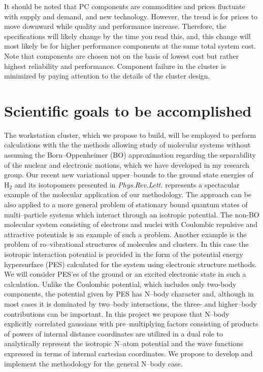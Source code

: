 It should be noted that PC components are commodities and prices
fluctuate
with supply and demand, and new technology. However, the trend is for
prices
to move downward while quality and performance increase. Therefore, the
specifications will likely change by the time you read this, and, this
change
will most likely be for higher performance components at the same total
system cost.
Note that components are chosen not on the basis of lowest cost but
rather
highest reliability and performance. Component failure in the cluster is
minimized by paying attention to the details of the cluster design.


\section{Scientific goals to be accomplished}



The workstation cluster, which we propose to build, will
be employed to perform calculations with the
the methods allowing study of molecular systems without
assuming the Born--Oppenheimer (BO) approximation regarding the
separability of the nuclear and electronic motions, which we have
developed in my research group.\cite{1,2,3,4,5,6}
Our recent new variational upper--bounds to the ground
state energies of H$_2$ and its isotopomers presented in
{\it Phys.Rev.Lett.}\cite{6} represents a spectacular example 
of the molecular application of our methodology.
The approach can be also applied to
a more general problem of stationary bound
quantum states of multi--particle
systems which interact through an isotropic potential.
The non-BO molecular system consisting of electrons and nuclei
with
Coulombic repulsive and attractive potentials
is an example of such a problem.
Another example
is the problem of ro--vibrational structures
of molecules and clusters.
In this case the isotropic interaction potential is provided
in the form of the potential energy hypersurface (PES)
calculated for the system using electronic structure methods.
We will consider PES'es of the
ground or an excited electronic state in such a calculation.
Unlike the Coulombic potential, which includes only two-body
components, the potential given by PES has N--body character and,
although in most cases it is dominated by two--body interactions,
the three- and higher--body contributions can be important.
In this project we propose that N--body
explicitly correlated gaussians with pre--multiplying factors consisting
of
products of powers of internal distance coordinates are utilized in a
dual
role to analytically represent the isotropic N--atom potential and the
wave functions expressed in terms of internal cartesian coordinates.
We propose to develop and implement the methodology for the general
N--body case.

